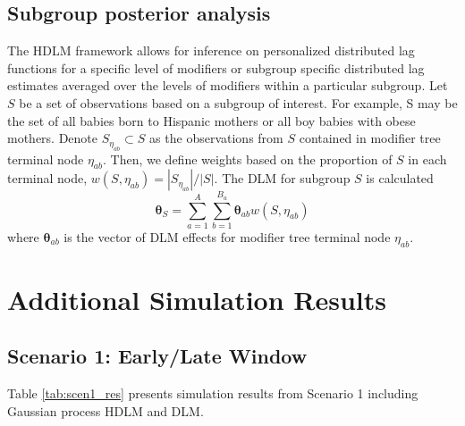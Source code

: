 \documentclass[12pt]{article}
\begin{document}
\subsection{Subgroup posterior analysis}
The HDLM framework allows for inference on personalized distributed lag functions for a specific level of modifiers or subgroup specific distributed lag estimates averaged over the levels of modifiers within a particular subgroup. Let $S$ be a set of observations based on a subgroup of interest. For example, S may be the set of all babies born to Hispanic mothers or all boy babies with obese mothers. Denote $S_{\eta_{ab}}\subset S$ as the observations from $S$ contained in modifier tree terminal node $\eta_{ab}$. Then, we define weights based on the proportion of $S$ in each terminal node, $w(S,\eta_{ab})=|S_{\eta_{ab}}|\big/|S|$. The DLM for subgroup $S$ is calculated
\begin{equation}
    \boldsymbol\theta_S=\sum_{a=1}^A\sum_{b=1}^{B_a}\boldsymbol\theta_{ab}w(S,\eta_{ab})
\end{equation}
where $\boldsymbol\theta_{ab}$ is the vector of DLM effects for modifier tree terminal node $\eta_{ab}$.


\section{Additional Simulation Results} 
\subsection{Scenario 1: Early/Late Window}
Table \ref{tab:scen1_res} presents simulation results from Scenario 1 including Gaussian process HDLM and DLM.
\end{document}
